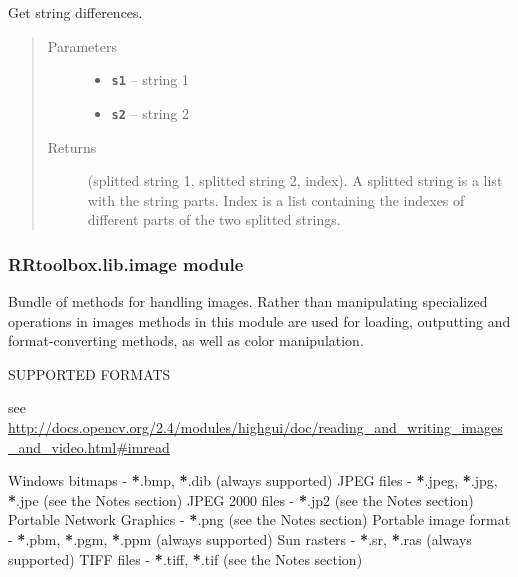 \documentclass[letterpaper,10pt,english]{sphinxmanual}
\begin{document}

\begin{fulllineitems}
\label{RRtoolbox.lib:RRtoolbox.lib.directory.strdifference}
Get string differences.
\begin{quote}\begin{description}
\item[{Parameters}] \leavevmode\begin{itemize}
\item {} 
\textbf{\texttt{s1}} -- string 1

\item {} 
\textbf{\texttt{s2}} -- string 2

\end{itemize}

\item[{Returns}] \leavevmode
(splitted string 1, splitted string 2, index).
A splitted string is a list with the string parts.
Index is a list containing the indexes of different parts of the two splitted strings.

\end{description}\end{quote}

\end{fulllineitems}



\subsubsection{RRtoolbox.lib.image module}
\label{RRtoolbox.lib:rrtoolbox-lib-image-module}\label{RRtoolbox.lib:module-RRtoolbox.lib.image}
Bundle of methods for handling images. Rather than manipulating specialized
operations in images methods in this module are used for loading, outputting
and format-converting methods, as well as color manipulation.

SUPPORTED FORMATS

see \href{http://docs.opencv.org/2.4/modules/highgui/doc/reading\_and\_writing\_images\_and\_video.html\#imread}{http://docs.opencv.org/2.4/modules/highgui/doc/reading\_and\_writing\_images\_and\_video.html\#imread}

Windows bitmaps - {\color{red}\bfseries{}*}.bmp, {\color{red}\bfseries{}*}.dib (always supported)
JPEG files - {\color{red}\bfseries{}*}.jpeg, {\color{red}\bfseries{}*}.jpg, {\color{red}\bfseries{}*}.jpe (see the Notes section)
JPEG 2000 files - {\color{red}\bfseries{}*}.jp2 (see the Notes section)
Portable Network Graphics - {\color{red}\bfseries{}*}.png (see the Notes section)
Portable image format - {\color{red}\bfseries{}*}.pbm, {\color{red}\bfseries{}*}.pgm, {\color{red}\bfseries{}*}.ppm (always supported)
Sun rasters - {\color{red}\bfseries{}*}.sr, {\color{red}\bfseries{}*}.ras (always supported)
TIFF files - {\color{red}\bfseries{}*}.tiff, {\color{red}\bfseries{}*}.tif (see the Notes section)
\end{document}
